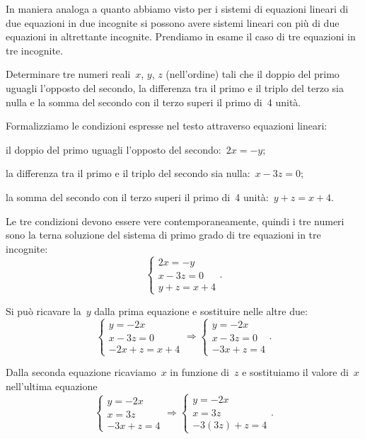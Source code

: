 In maniera analoga a quanto abbiamo visto per i sistemi di equazioni lineari di due equazioni in due incognite si possono avere sistemi lineari con più di due equazioni in altrettante incognite. Prendiamo in esame il caso di tre equazioni in tre incognite.

\begin{problema}
Determinare tre numeri reali~$x$, $y$, $z$ (nell'ordine) tali
che il doppio del primo uguagli l'opposto del secondo,
la differenza tra il primo e il triplo del terzo sia nulla e la somma
del secondo con il terzo superi il primo di~4 unità.
\end{problema}

\begin{soluzione}
Formalizziamo le condizioni espresse nel testo attraverso equazioni
lineari:

\begin{enumeratea}
\item il doppio del primo uguagli l'opposto del secondo:~$2x=-y$;
\item la differenza tra il primo e il triplo del secondo sia nulla:~$x-3z=0$;
\item la somma del secondo con il terzo superi il primo di~4 unità:~$y+z=x+4$.
\end{enumeratea}
Le tre condizioni devono essere vere contemporaneamente, quindi i tre
numeri sono la terna soluzione del sistema di primo grado di tre equazioni in tre incognite:
\[\left\{\begin{array}{l}2x=-y\\x-3z=0\\y+z=x+4\end{array}\right..\]

Si può ricavare la~$y$ dalla prima equazione e sostituire nelle altre due:
\[\left\{\begin{array}{l}y=-2x\\x-3z=0\\-2x+z=x+4\end{array}\right.\Rightarrow
\left\{\begin{array}{l}y=-2x\\x-3z=0\\-3x+z=4\end{array}\right..\]

Dalla seconda equazione ricaviamo~$x$ in funzione di~$z$ e sostituiamo il valore di~$x$ nell'ultima equazione
\[\left\{\begin{array}{l}y=-2x \\x=3z
\\-3x+z=4 \end{array}\right.
\Rightarrow\left\{\begin{array}{l}y=-2x \\x=3z
\\-3(3z)+z=4 \end{array}\right..\]


\end{soluzione}
